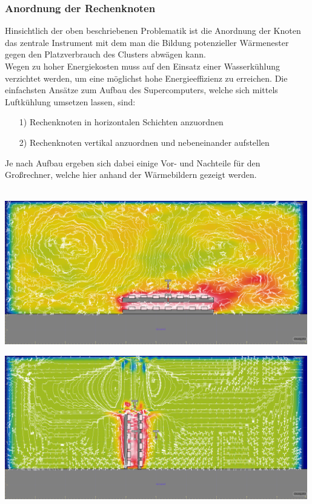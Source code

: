 \subsubsection{Anordnung der Rechenknoten}
Hinsichtlich der oben beschriebenen Problematik ist die Anordnung der Knoten 
das zentrale Instrument mit dem man die Bildung potenzieller Wärmenester 
gegen den Platzverbrauch des Clusters abwägen kann.~\\
Wegen zu hoher Energiekosten muss auf den Einsatz einer
Wasserkühlung verzichtet werden, um eine möglichst 
hohe Energieeffizienz zu erreichen.
Die einfachsten Ansätze zum Aufbau des Supercomputers, 
welche sich mittels Luftkühlung umsetzen lassen, sind:
\begin{itemize}
\item[1)]Rechenknoten in horizontalen Schichten anzuordnen
\item[2)]Rechenknoten vertikal anzuordnen und nebeneinander aufstellen
\end{itemize} 
Je nach Aufbau ergeben sich dabei einige Vor- und Nachteile für den Großrechner, welche hier anhand der
Wärmebildern gezeigt werden.\\
~\\
\begin{minipage}{0.50\textwidth}
\centering
	\includegraphics[width=0.99\textwidth]{./Bilder/Server-Aufbau/convective-horizontal-2.png}
	\label{fig:HWPabb1}

\end{minipage}
\hfill
\begin{minipage}{0.50\textwidth}
\centering
	\includegraphics[width=0.99\textwidth]{./Bilder/Server-Aufbau/convective-vertical-2.png}
	\label{fig:HWPabb2}
\end{minipage}
